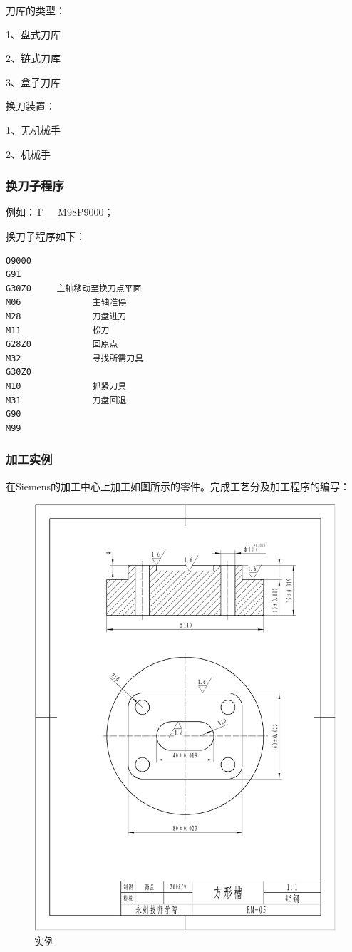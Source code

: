 刀库的类型：

1、盘式刀库

2、链式刀库

3、盒子刀库

换刀装置：

1、无机械手

2、机械手

\subsubsection{换刀子程序}

例如：T\_\_M98P9000；

换刀子程序如下：
\begin{lstlisting}
O9000
G91
G30Z0     主轴移动至换刀点平面
M06              主轴准停
M28              刀盘进刀
M11              松刀
G28Z0            回原点
M32              寻找所需刀具
G30Z0            
M10              抓紧刀具
M31              刀盘回退
G90              
M99
\end{lstlisting}

\subsubsection{加工实例}

在Siemens的加工中心上加工如图所示的零件。完成工艺分及加工程序的编写：


\begin{figure}[h]
	\centering
	\includegraphics[width=0.7\linewidth]{data/image/26-1}
	\caption{实例}
	\label{fig:26-1}
\end{figure}


